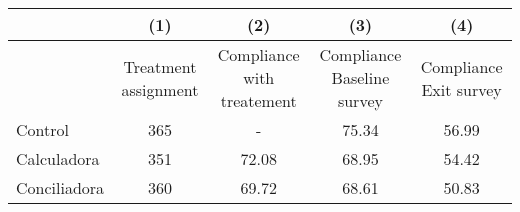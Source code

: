 \begin{tabular}{rcccc}
\toprule
      & (1)   & (2)   & (3)   & (4) \\
\midrule
      & Treatment assignment & Compliance with treatement & Compliance Baseline survey & Compliance Exit survey \\
\multicolumn{1}{l}{Control} & 365   & -     & 75.34 & 56.99 \\
\multicolumn{1}{l}{Calculadora } & 351   & 72.08 & 68.95 & 54.42 \\
\multicolumn{1}{l}{Conciliadora} & 360   & 69.72 & 68.61 & 50.83 \\
\bottomrule
\end{tabular}%
